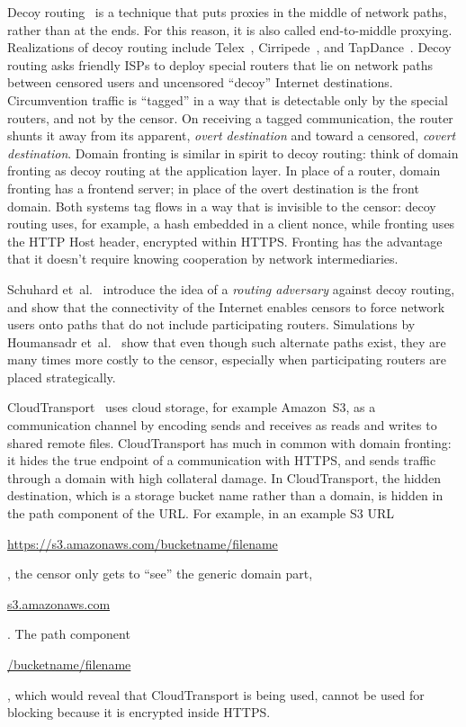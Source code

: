 \documentclass[conference]{IEEEtran}
\def\urll#1{\begin{NoHyper}\url{#1}\end{NoHyper}}
\begin{document}
Decoy routing~\cite{decoyrouting}
is a technique that puts
proxies in the middle of network paths, rather than at the ends.
For this reason, it is also called end-to-middle proxying.
Realizations of decoy routing include Telex~\cite{telex},
Cirripede~\cite{cirripede}, and TapDance~\cite{tapdance}.
Decoy routing asks friendly ISPs to deploy special routers that lie
on network paths between censored users and uncensored ``decoy'' Internet destinations.
Circumvention traffic is ``tagged'' in a way that is detectable only
by the special routers, and not by the censor.
On receiving a tagged communication, the router shunts it away from its apparent, \emph{overt destination}
and toward a censored, \emph{covert destination}.
Domain fronting is similar in spirit to decoy routing:
think of domain fronting as decoy routing at the application layer.
In place of a router, domain fronting has a frontend server;
in place of the overt destination is the front domain.
Both systems tag flows in a way that is invisible to the censor:
decoy routing uses, for example, a hash embedded in a client nonce,
while fronting uses the HTTP Host header, encrypted within HTTPS.
Fronting has the advantage that it doesn't require knowing cooperation by network intermediaries.

Schuhard et~al.~\cite{ccs2012-decoys}
introduce the idea of a \emph{routing adversary} against decoy routing,
and show that the connectivity of the Internet enables
censors to force network users onto paths that do not include participating routers.
Simulations by Houmansadr et~al.~\cite{nodirectionhome}
show that even though such alternate paths exist,
they are many times more costly to the censor,
especially when participating routers are placed strategically.

CloudTransport~\cite{cloudtransport} uses cloud storage, for example Amazon~S3,
as a communication channel by encoding sends and receives as reads and writes to shared remote files.
CloudTransport has much in common with domain fronting:
it hides the true endpoint of a communication with HTTPS,
and sends traffic through a domain with high collateral damage.
In CloudTransport, the hidden destination, which is a storage bucket name rather than a domain,
is hidden in the path component of the URL.
For example, in an example S3 URL
\urll{https://s3.amazonaws.com/bucketname/filename},
the censor only gets to ``see'' the generic domain part, \urll{s3.amazonaws.com}.
The path component \urll{/bucketname/filename},
which would reveal that CloudTransport is being used,
cannot be used for blocking because it is encrypted inside HTTPS.
\end{document}
